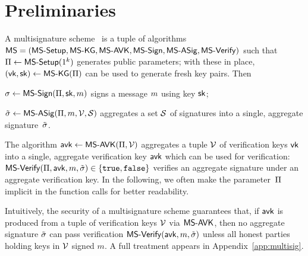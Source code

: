 \section{Preliminaries}\label{sec:prel}

%
A multisignature scheme~\cite{itakura1983public,CCS:MicOhtRey01} is a
tuple of algorithms 
$\mathsf{MS} = (\mathsf{MS\textsf{-}{}Setup},\allowbreak\mathsf{MS\textsf{-}{}KG},\allowbreak\mathsf{MS\textsf{-}{}AVK},\allowbreak
\mathsf{MS\textsf{-}{}Sign},\mathsf{MS\textsf{-}{}ASig},\mathsf{MS\textsf{-}{}Verify})$ such that
$\Pi \gets \mathsf{MS\textsf{-}{}Setup}(1^k)$ generates public parameters;
with these in place,
$(\mathsf{vk},\mathsf{sk}) \gets \mathsf{MS\textsf{-}{}KG}(\Pi)$ can be used to generate
fresh key pairs. Then
\begin{mitemize}
  \item $\sigma \gets \mathsf{MS\textsf{-}{}Sign}(\Pi,\mathsf{sk},m)$ signs 
    a message $m$ using key $\mathsf{sk}$;
  \item $\tilde \sigma \gets \mathsf{MS\textsf{-}{}ASig}(\Pi,m,\mathcal V,\mathcal S)$ aggregates a
    set $\mathcal S$ of signatures into a single, aggregate signature~$\tilde \sigma$.
  \end{mitemize}
  The algorithm $\mathsf{avk} \gets \mathsf{MS\textsf{-}{}AVK}(\Pi,\mathcal V)$ aggregates
  a tuple $\mathcal V$ of verification keys $\mathsf{vk}$ into a single,
  aggregate verification key $\mathsf{avk}$ which can be used for verification:
  $\mathsf{MS\textsf{-}{}Verify}(\Pi,\mathsf{avk},m,\tilde \sigma) \in \{\mathtt{true},\mathtt{false}\}$
  verifies an aggregate signature under an aggregate verification key.
  In the following, we often make the parameter~$\Pi$ implicit in the
    function calls for better readability.

  Intuitively, the security of a multisignature scheme guarantees
  that, if $\mathsf{avk}$ is produced from a tuple of verification keys
  $\mathcal V$ via $\mathsf{MS\textsf{-}{}AVK}$, then no aggregate signature $\tilde \sigma$ can
  pass verification $\mathsf{MS\textsf{-}{}Verify}(\mathsf{avk},m,\tilde \sigma)$ unless all
  honest parties holding keys in $\mathcal V$ signed $m$. A full treatment
  appears in Appendix~\ref{app:multisig}.


